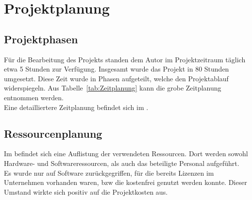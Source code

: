 \section{Projektplanung} 
\label{sec:Projektplanung}

\subsection{Projektphasen}
\label{sec:Projektphasen}
Für die Bearbeitung des Projekts standen dem Autor im Projektzeitraum täglich etwa 5 Stunden zur Verfügung.
Insgesamt wurde das Projekt in 80 Stunden umgesetzt. Diese Zeit wurde in Phasen aufgeteilt, welche den
Projektablauf widerspiegeln. Aus Tabelle~\ref{tab:Zeitplanung} kann die grobe Zeitplanung entnommen werden.
\\
Eine detailliertere Zeitplanung befindet sich im .


\subsection{Ressourcenplanung}
\label{sec:Ressourcenplanung}
Im  befindet sich eine Auflistung der verwendeten Ressourcen.
Dort werden sowohl Hardware- und Softwareressourcen, als auch das beteiligte Personal aufgeführt.
Es wurde nur auf Software zurückgegriffen, für die bereits Lizenzen im Unternehmen vorhanden waren,
\acs{bzw} die kostenfrei genutzt werden konnte. Dieser Umstand wirkte sich positiv auf die Projektkosten aus.


